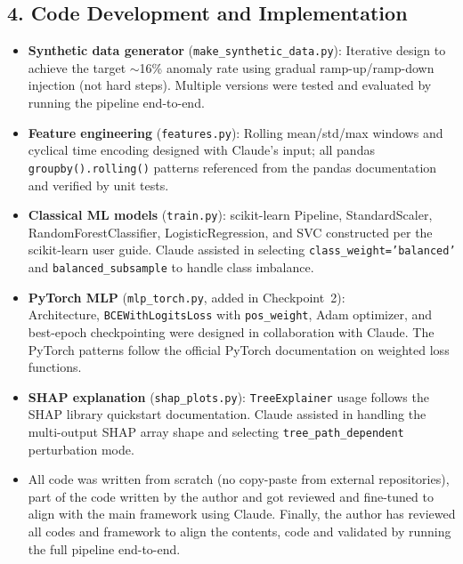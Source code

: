 \documentclass{article}
\begin{document}
\subsection*{4. Code Development and Implementation}
\begin{itemize}
  \item \textbf{Synthetic data generator} (\texttt{make\_synthetic\_data.py}):
        Iterative design to achieve the target $\sim$16\% anomaly rate
        using gradual ramp-up/ramp-down injection (not hard steps). Multiple
        versions were tested and evaluated by running the pipeline end-to-end.
  \item \textbf{Feature engineering} (\texttt{features.py}): Rolling mean/std/max
        windows and cyclical time encoding designed with Claude's input; all pandas
        \texttt{groupby().rolling()} patterns referenced from the pandas
        documentation and verified by unit tests.
  \item \textbf{Classical ML models} (\texttt{train.py}): scikit-learn Pipeline,
        StandardScaler, RandomForestClassifier, LogisticRegression, and SVC
        constructed per the scikit-learn user guide. Claude assisted in selecting
        \texttt{class\_weight='balanced'} and \texttt{balanced\_subsample} to
        handle class imbalance.
  \item \textbf{PyTorch MLP} (\texttt{mlp\_torch.py}, added in Checkpoint~2):\\
        Architecture, \texttt{BCEWithLogitsLoss} with \texttt{pos\_weight}, Adam
        optimizer, and best-epoch checkpointing were designed in collaboration
        with Claude. The PyTorch patterns follow the official PyTorch documentation
        on weighted loss functions.
  \item \textbf{SHAP explanation} (\texttt{shap\_plots.py}): \texttt{TreeExplainer}
        usage follows the SHAP library quickstart documentation. Claude assisted
        in handling the multi-output SHAP array shape and selecting
        \texttt{tree\_path\_dependent} perturbation mode.
  \item All code was written from scratch (no copy-paste from external
        repositories), part of the code written by the author and got reviewed and
        fine-tuned to align with the main framework using Claude. Finally, the author has
        reviewed all codes and framework to align the contents, code and validated 
        by running the full pipeline end-to-end.
\end{itemize}
\end{document}
